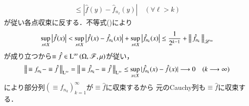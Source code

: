 \begin{prf}
\begin{description}
\begin{align}
				\leq \left| \hat{f}(y) - \hat{f}_{n_\ell}(y) \right|
				\quad (\forall \ell > k)
			\end{align}
			が従い各点収束に反する．不等式()により
			\begin{align}
				\operatorname*{sup}_{x \in X} \left| \hat{f}(x) \right| 
				< \operatorname*{sup}_{x \in X} \left| \hat{f}(x) - \hat{f}_{n_k}(x) \right| + \operatorname*{sup}_{x \in X} \left| \hat{f}_{n_k}(x) \right| 
				\leq \frac{1}{2^{k-1}} + \left\|\, \hat{f}_{n_k}\, \right\|_{\mathscr{L}^\infty}
			\end{align}
			が成り立つから$\equiv{\hat{f}}{} \in \operatorname{L}^{\infty} \left(\Omega,\mathscr{F},\mu\right)$が従い，
			\begin{align}
				\left\|\, \equiv{f_{n_k}}{} - \equiv{\hat{f}}{}\, \right\|_{\mathrm{L}^\infty}
				= \left\|\, \equiv{\hat{f}_{n_k}}{} - \equiv{\hat{f}}{}\, \right\|_{\mathrm{L}^\infty}
				\leq \operatorname*{sup}_{x \in X} |\hat{f}_{n_k}(x) - \hat{f}(x)|
				\longrightarrow 0 \quad (k \longrightarrow \infty)
			\end{align}
			により部分列$\left( \equiv{f_{n_k}}{} \right)_{k=1}^{\infty}$が$\equiv{\hat{f}}{}$に収束するから
			元のCauchy列も$\equiv{\hat{f}}{}$に収束する．
			

\end{description}
\end{prf}
